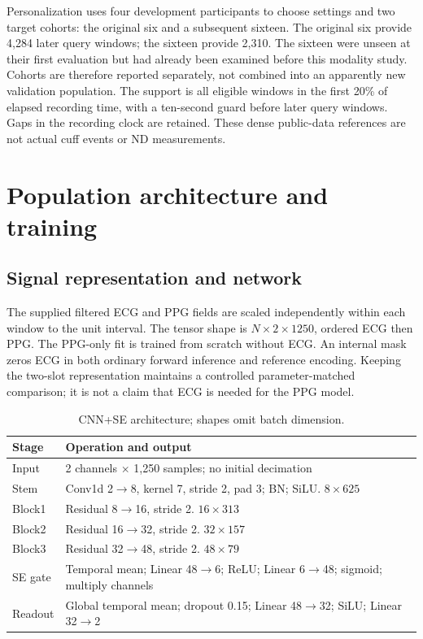 \documentclass[conference]{IEEEtran}
\begin{document}
Personalization uses four development participants to choose settings and two
target cohorts: the original six and a subsequent sixteen. The original six
provide 4,284 later query windows; the sixteen provide 2,310. The sixteen were
unseen at their first evaluation but had already been examined before this
modality study. Cohorts are therefore reported separately, not combined into
an apparently new validation population. The support is all eligible windows
in the first 20\% of elapsed recording time, with a ten-second guard before
later query windows. Gaps in the recording clock are retained. These dense
public-data references are not actual cuff events or ND measurements.

\section{Population architecture and training}
\subsection{Signal representation and network}
The supplied filtered ECG and PPG fields are scaled independently within each
window to the unit interval. The tensor shape is $N\times2\times1250$, ordered
ECG then PPG. The PPG-only fit is trained from scratch without ECG. An internal
mask zeros ECG in both ordinary forward inference and reference encoding.
Keeping the two-slot representation maintains a controlled parameter-matched
comparison; it is not a claim that ECG is needed for the PPG model.

\begin{table}[t]\centering\small
\caption{CNN+SE architecture; shapes omit batch dimension.}
\label{tab:layers}
\begin{tabular}{lp{2.45in}}\toprule
Stage & Operation and output\\\midrule
Input & 2 channels $\times$ 1,250 samples; no initial decimation\\
Stem & Conv1d 2$\to$8, kernel 7, stride 2, pad 3; BN; SiLU. $8\times625$\\
Block1 & Residual 8$\to$16, stride 2. $16\times313$\\
Block2 & Residual 16$\to$32, stride 2. $32\times157$\\
Block3 & Residual 32$\to$48, stride 2. $48\times79$\\
SE gate & Temporal mean; Linear 48$\to$6; ReLU; Linear 6$\to$48; sigmoid; multiply channels\\
Readout & Global temporal mean; dropout 0.15; Linear 48$\to$32; SiLU; Linear 32$\to$2\\\bottomrule
\end{tabular}\end{table}
\end{document}
